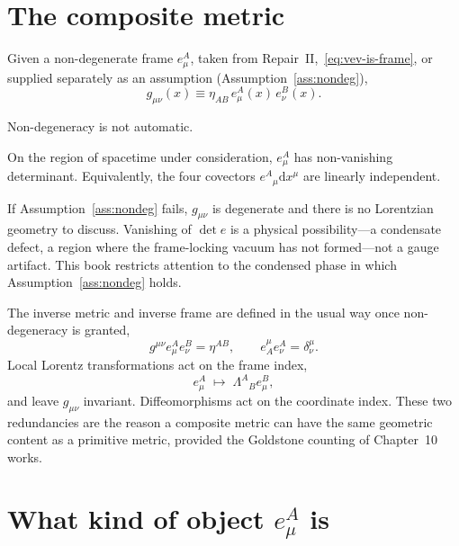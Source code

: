 \section{The composite metric}
\label{sec:ch4-metric}

\begin{definition}
  \label{def:composite-metric}
  Given a non-degenerate frame \(e^A_\mu\), taken from
  Repair~II,~\eqref{eq:vev-is-frame}, or supplied separately as an
  assumption (Assumption~\ref{ass:nondeg}),
  \begin{equation}
    \label{eq:g-from-e}
    g_{\mu\nu}(x)
    \equiv
    \eta_{AB}\,e^A_\mu(x)\,e^B_\nu(x).
  \end{equation}
\end{definition}

Non-degeneracy is not automatic.

\begin{assumption}
  \label{ass:nondeg}
  On the region of spacetime under consideration, \(e^A_\mu\) has
  non-vanishing determinant. Equivalently, the four covectors
  \(e^A{}_\mu\mathrm{d}x^\mu\) are linearly independent.
\end{assumption}

If Assumption~\ref{ass:nondeg} fails, \(g_{\mu\nu}\) is degenerate and
there is no Lorentzian geometry to discuss. Vanishing of
\(\det e\) is a physical possibility---a condensate defect, a
region where the frame-locking vacuum has not formed---not a gauge
artifact. This book restricts attention to the condensed phase in
which Assumption~\ref{ass:nondeg} holds.

The inverse metric and inverse frame are defined in the usual way
once non-degeneracy is granted,
\begin{equation}
  \label{eq:inverses}
  g^{\mu\nu}e^A_\mu e^B_\nu=\eta^{AB},\qquad
  e^\mu_A e^A_\nu=\delta^\mu_\nu.
\end{equation}
Local Lorentz transformations act on the frame index,
\begin{equation}
  \label{eq:llts}
  e^A_\mu\;\longmapsto\;\Lambda^A{}_B e^B_\mu,
\end{equation}
and leave \(g_{\mu\nu}\) invariant. Diffeomorphisms act on the
coordinate index. These two redundancies are the reason a composite
metric can have the same geometric content as a primitive metric,
provided the Goldstone counting of Chapter~10 works.

\section{What kind of object \(e^A_\mu\) is}
\label{sec:ch4-status}

